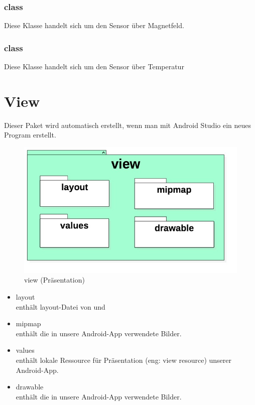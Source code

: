 \documentclass[a4paper]{scrreprt}
\begin{document}
                \subsubsection{class }
                Diese Klasse handelt sich um den Sensor über Magnetfeld.
                \subsubsection{class }
                Diese Klasse handelt sich um den Sensor über Temperatur

        \newpage
        \section{View}

            Dieser Paket wird automatisch erstellt,  wenn man mit Android Studio ein neues Program erstellt.

            \vspace*{1cm}
            \begin{figure}[H]
                \centering
                \includegraphics[scale = 0.7]{view.jpg}
                \caption{view (Präsentation)}
            \end{figure}

            \begin{itemize}
                \item layout \\
                    enthält layout-Datei von  und 
                \item mipmap \\
                    enthält die in unsere Android-App verwendete Bilder.
                \item values\\
                    enthält lokale Ressource für Präsentation (eng: view resource) unserer Android-App.
                \item drawable\\
                    enthält die in unsere Android-App verwendete Bilder.
            \end{itemize}
\end{document}
